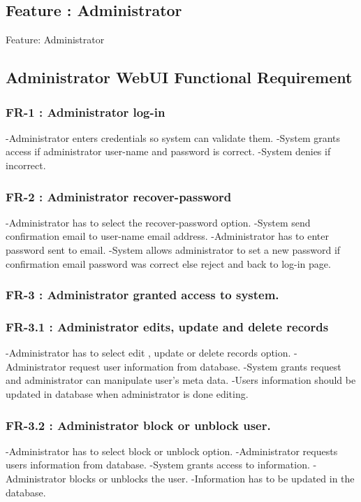 \begin{Requirements}
\section{Feature : Administrator}
Feature:  Administrator 
\subsection{Administrator WebUI Functional Requirement}

\subsubsection{FR-1  : Administrator log-in}
	  	-Administrator enters credentials so system can validate them.
	 	-System grants access if administrator user-name and password is correct.
	 	-System denies if incorrect.
	  
\subsubsection{FR-2   : Administrator recover-password}
		-Administrator has to select the recover-password option.
		-System send confirmation email to user-name email address.
		-Administrator has to enter password sent to email.
	  	-System allows administrator to set a new password if confirmation email password was correct else reject and back to 			 log-in page.
\subsubsection{FR-3   :	Administrator granted access to system.}
  	
\subsubsection{FR-3.1 :	Administrator edits, update and delete records}
		-Administrator has to select edit , update or delete records option.
		-Administrator request user information from database.
		-System grants request and administrator can manipulate user's meta data.
		-Users information should be updated in database when administrator is done editing.
		
\subsubsection{FR-3.2 :	Administrator block or unblock user.}
		-Administrator has to select block or unblock option.
		-Administrator requests users information from database.
		-System grants access to information.
		-Administrator blocks or unblocks the user.
		-Information has to be updated in the database.
		

\end{Requirements}
